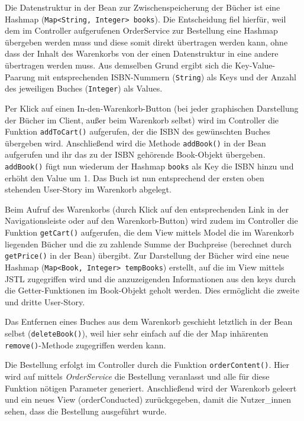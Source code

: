 	Die Datenstruktur in der Bean zur Zwischenspeicherung der Bücher ist eine Hashmap (\lstinline|Map<String, Integer> books|). Die Entscheidung fiel hierfür, weil dem im Controller aufgerufenen OrderService zur Bestellung eine Hashmap übergeben werden muss und diese somit direkt übertragen werden kann, ohne dass der Inhalt des Warenkorbs von der einen Datenstruktur in eine andere übertragen werden muss. Aus demselben Grund ergibt sich die Key-Value-Paarung mit entsprechenden ISBN-Nummern (\lstinline|String|) als Keys und der Anzahl des jeweiligen Buches (\lstinline|Integer|) als Values. 
	 
	Per Klick auf einen In-den-Warenkorb-Button (bei jeder graphischen Darstellung der Bü\-cher im Client, außer beim Warenkorb selbst) wird im Controller die Funktion \lstinline|addToCart()| aufgerufen, der die ISBN des gewünschten Buches übergeben wird. Anschließend wird die Methode \lstinline|addBook()| in der Bean aufgerufen und ihr das zu der ISBN gehörende Book-Objekt übergeben. \lstinline|addBook()| fügt nun wiederum der Hashmap \lstinline|books| als Key die ISBN hinzu und  erhöht den Value um 1. Das Buch ist nun entsprechend der ersten oben stehenden User-Story im Warenkorb abgelegt.
	
	Beim Aufruf des Warenkorbs (durch Klick auf den entsprechenden Link in der Navigationsleiste oder auf den Warenkorb-Button) wird zudem im Controller die Funktion \lstinline|getCart()| aufgerufen, die dem View mittels Model die im Warenkorb liegenden Bücher und die zu zahlende Summe der Buchpreise (berechnet durch \lstinline|getPrice()| in der Bean) übergibt. Zur Darstellung der Bücher wird eine neue Hashmap (\lstinline|Map<Book, Integer> tempBooks|) erstellt, auf die im View mittels JSTL zugegriffen wird und die anzuzeigenden Informationen aus den keys durch die Getter-Funktionen im Book-Objekt geholt werden. Dies ermöglicht die zweite und dritte User-Story.
	
	Das Entfernen eines Buches aus dem Warenkorb geschieht letztlich in der Bean selbst (\lstinline|deleteBook()|), weil hier sehr einfach auf die der Map inhärenten \lstinline|remove()|-Me\-tho\-de zugegriffen werden kann.
	
	Die Bestellung erfolgt im Controller durch die Funktion \lstinline|orderContent()|. Hier wird auf mittels \textit{OrderService} die Bestellung veranlasst und alle für diese Funktion nötigen Parameter generiert. Anschließend wird der Warenkorb geleert und ein neues View (orderConducted) zurückgegeben, damit die Nutzer\_innen sehen, dass die Bestellung ausgeführt wurde.
	
